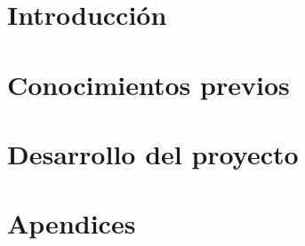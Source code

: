 \documentclass[12pt,a4paper]{memoir}
\begin{document}
\newpage

\tableofcontents*
\newpage
\renewcommand{\thepage}{\arabic{page}}
\setcounter{page}{0}

\pagestyle{fancy}

\part{Introducción}
 

\part{Conocimientos previos}





\part{Desarrollo del proyecto}


   

		

\nocite{*}



\pagestyle{empty}
\part{Apendices}	
      	
      	





				 	
\end{document}
